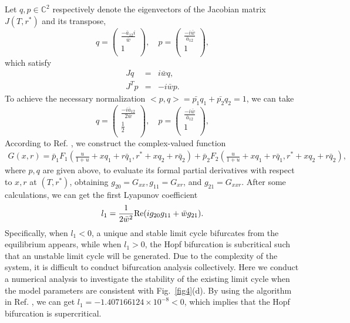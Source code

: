 \documentclass[9pt]{elife}
\begin{document}
\begin{appendixbox}
Let $q, p \in \mathbb{C}^{2}$ respectively denote the eigenvectors of the Jacobian matrix $J(T, r^{*})$ and its transpose,
\begin{equation}
q=\left(
  \begin{array}{c}
    \frac{-\bar{a}_{12}i}{\bar{w}} \\
    1 \\
  \end{array}
\right), \quad
p= \left(
  \begin{array}{c}
    \frac{-i\bar{w}}{\bar{a}_{12}} \\
    1 \\
  \end{array}
\right),
\end{equation}
which satisfy
\begin{eqnarray*}
Jq&=&i\bar{w}q,\\
J^{T}p&=&-i\bar{w}p.
\end{eqnarray*}
To achieve the necessary normalization $<p,q>=\bar{p_{1}}q_{1}+\bar{p_{2}}q_{2}=1$, we can take
\begin{equation}
q=\left(
  \begin{array}{c}
    \frac{-i\bar{a}_{12}}{2\bar{w}} \\
    \frac{1}{2} \\
  \end{array}
\right), \quad
p= \left(
  \begin{array}{c}
    \frac{-i\bar{w}}{\bar{a}_{12}} \\
    1 \\
  \end{array}
\right),
\end{equation}
According to Ref. \citep{kuznetsov1998elements}, we construct the complex-valued function
\begin{eqnarray*}
G(x, r)=\bar{p}_{1}F_{1}(\frac{u}{1+u}+xq_{1}+r\bar{q}_{1}, r^{*}+xq_{2}+r\bar{q}_{2})+\bar{p}_{2}F_{2}(\frac{u}{1+u}+xq_{1}+r\bar{q}_{1}, r^{*}+xq_{2}+r\bar{q}_{2}),
\end{eqnarray*}
where $p, q$ are given above, to evaluate its formal partial derivatives with respect to $x, r$ at $(T, r^{*})$, obtaining $g_{20} = G_{xx}, g_{11} = G_{xr}$, and $g_{21} = G_{xxr}$. After some calculations, we can get the first Lyapunov coefficient
\begin{eqnarray*}
l_{1}=\frac{1}{2\bar{w}^{2}}{\rm Re}(ig_{20}g_{11}+\bar{w}g_{21}).
\end{eqnarray*}
Specifically, when $l_{1}<0$, a unique and stable limit cycle bifurcates from the equilibrium appears, while when $l_{1}>0$, the Hopf bifurcation is subcritical such that an unstable limit cycle will be generated. Due to the complexity of the system, it is difficult to conduct bifurcation analysis collectively. Here we conduct a numerical analysis to investigate the stability of the existing limit cycle when the model parameters are consistent with Fig.~\ref{fig4}(d). By using the algorithm in Ref. \citep{kuznetsov1998elements}, we can get $l_{1}=-1.407166124 \times 10^{-8}<0$, which implies that the Hopf bifurcation is supercritical.


\end{appendixbox}
\end{document}
